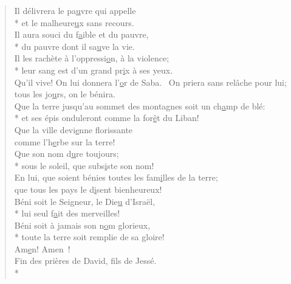\begin{verse}
Il délivrera le pa\underline{u}vre qui appelle \\*
et le malheure\underline{u}x sans recours. \\
Il aura souci du f\underline{a}ible et du pauvre, \\*
du pauvre dont il sa\underline{u}ve la vie. \\

Il les rachète à l’oppressi\underline{o}n, à la violence; \\*
leur sang est d’un grand pr\underline{i}x à ses yeux. \\
Qu’il vive! On lui donnera l’\underline{o}r de Saba.~\psalmstar
On priera sans relâche pour lui; \\
tous les jo\underline{u}rs, on le bénira. \\

Que la terre jusqu’au sommet des montagnes soit un ch\underline{a}mp de blé: \\*
et ses épis onduleront comme la for\underline{ê}t du Liban! \\
Que la ville devi\underline{e}nne florissante \\
comme l’h\underline{e}rbe sur la terre! \\

Que son nom d\underline{u}re toujours; \\*
sous le soleil, que subs\underline{i}ste son nom! \\
En lui, que soient bénies toutes les fam\underline{i}lles de la terre; \\
que tous les pays le d\underline{i}sent bienheureux! \\

Béni soit le Seigneur, le Die\underline{u} d’Israël, \\*
lui seul f\underline{a}it des merveilles! \\
Béni soit à jamais son n\underline{o}m glorieux, \\*
toute la terre soit remplie de sa gloire! \\
Am\underline{e}n! Amen ! \\

Fin des prières de David, fils de Jessé. \\*
\end{verse}

